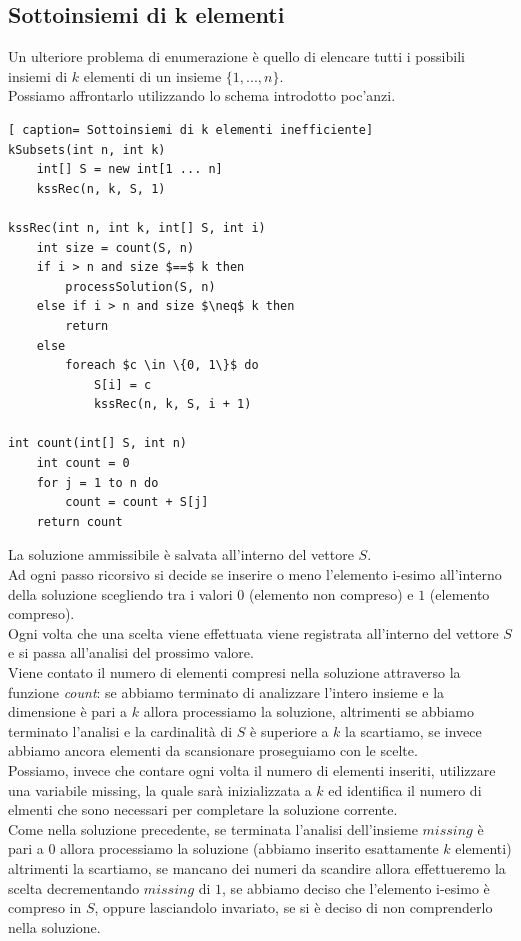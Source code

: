 \documentclass[../cheatSheetAlgoritmi.tex]{subfiles}
\begin{document}
\subsection{Sottoinsiemi di k elementi}
Un ulteriore problema di enumerazione è quello di elencare tutti i possibili insiemi di $k$ elementi di un insieme $\{1, ..., n\}$. \\
Possiamo affrontarlo utilizzando lo schema introdotto poc'anzi.
 \begin{lstlisting}[ caption= Sottoinsiemi di k elementi inefficiente]
kSubsets(int n, int k)
	int[] S = new int[1 ... n]
	kssRec(n, k, S, 1)

kssRec(int n, int k, int[] S, int i)
	int size = count(S, n)
	if i > n and size $==$ k then
		processSolution(S, n)
	else if i > n and size $\neq$ k then
		return 
	else
		foreach $c \in \{0, 1\}$ do
			S[i] = c
			kssRec(n, k, S, i + 1)
			
int count(int[] S, int n)
	int count = 0
	for j = 1 to n do
		count = count + S[j]
	return count
\end{lstlisting}
La soluzione ammissibile è salvata all'interno del vettore $S$. \\
Ad ogni passo ricorsivo si decide se inserire o meno l'elemento i-esimo all'interno della soluzione scegliendo tra i valori $0$ (elemento non compreso) e $1$ (elemento compreso).  \\
Ogni volta che una scelta viene effettuata viene registrata all'interno del vettore $S$ e si passa all'analisi del prossimo valore. \\
Viene contato il numero di elementi compresi nella soluzione attraverso la funzione \emph{count}: se abbiamo terminato di analizzare l'intero insieme e la dimensione è pari a $k$ allora processiamo la soluzione, altrimenti se abbiamo terminato l'analisi e la cardinalità di $S$ è superiore a $k$ la scartiamo, se invece abbiamo ancora elementi da scansionare proseguiamo con le scelte. \\
Possiamo, invece che contare ogni volta il numero di elementi inseriti, utilizzare una variabile missing, la quale sarà inizializzata a $k$ ed identifica il numero di elmenti che sono necessari per completare la soluzione corrente. \\ 
Come nella soluzione precedente, se terminata l'analisi dell'insieme $missing$ è pari a $0$ allora processiamo la soluzione (abbiamo inserito esattamente $k$ elementi) altrimenti la scartiamo, se mancano dei numeri da scandire allora effettueremo la scelta decrementando $missing$ di $1$, se abbiamo deciso che l'elemento i-esimo è compreso in $S$, oppure lasciandolo invariato, se si è deciso di non comprenderlo nella soluzione. \\
\end{document}
